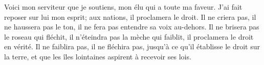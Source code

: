 Voici mon serviteur que je soutiens, mon élu qui a toute ma faveur.
	J’ai fait reposer sur lui mon esprit; aux nations, il proclamera le droit.
Il ne criera pas, il ne haussera pas le ton,
	il ne fera pas entendre sa voix au-dehors.
Il ne brisera pas le roseau qui fléchit, il n’éteindra pas la mèche qui faiblit,
	il proclamera le droit en vérité.
Il ne faiblira pas, il ne fléchira pas, jusqu’à ce qu’il établisse le droit sur la terre,
	et que les îles lointaines aspirent à recevoir ses lois.
